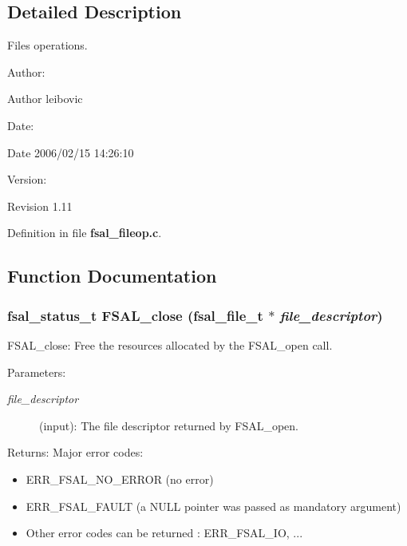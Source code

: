 \subsection{Detailed Description}
Files operations. 

\begin{Desc}
\item[Author:]\end{Desc}
\begin{Desc}
\item[Author]leibovic \end{Desc}
\begin{Desc}
\item[Date:]\end{Desc}
\begin{Desc}
\item[Date]2006/02/15 14:26:10 \end{Desc}
\begin{Desc}
\item[Version:]\end{Desc}
\begin{Desc}
\item[Revision]1.11 \end{Desc}


Definition in file {\bf fsal\_\-fileop.c}.

\subsection{Function Documentation}
\subsubsection[{FSAL\_\-close}]{\setlength{\rightskip}{0pt plus 5cm}fsal\_\-status\_\-t FSAL\_\-close (fsal\_\-file\_\-t $\ast$ {\em file\_\-descriptor})}\label{fsal__fileop_8c_414fc929818222ab0c26779cea528629}


FSAL\_\-close: Free the resources allocated by the FSAL\_\-open call.

\begin{Desc}
\item[Parameters:]
\begin{description}
\item[{\em file\_\-descriptor}](input): The file descriptor returned by FSAL\_\-open.\end{description}
\end{Desc}
\begin{Desc}
\item[Returns:]Major error codes:\begin{itemize}
\item ERR\_\-FSAL\_\-NO\_\-ERROR (no error)\item ERR\_\-FSAL\_\-FAULT (a NULL pointer was passed as mandatory argument)\item Other error codes can be returned : ERR\_\-FSAL\_\-IO, ... \end{itemize}
\end{Desc}


